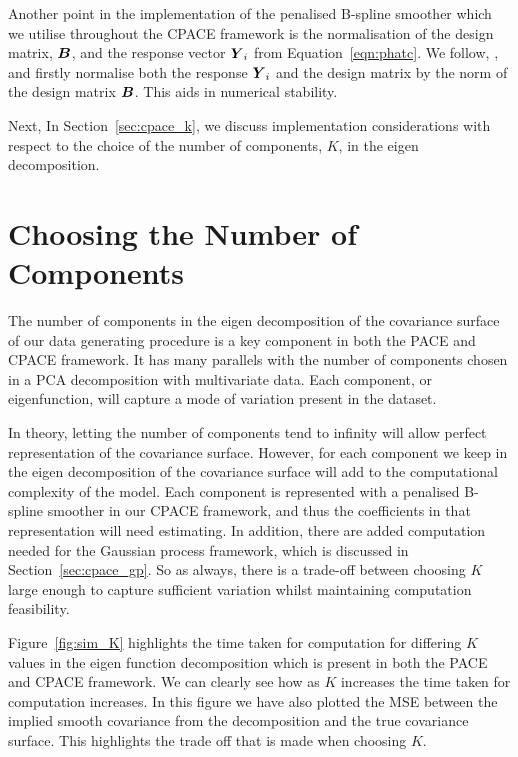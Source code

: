 Another point in the implementation of the penalised B-spline smoother which we utilise throughout the CPACE framework is the normalisation of the design matrix, $\bm{{B}}$, and the response vector $\bm{{Y}}_{i}$ from Equation~\ref{eqn:phatc}.
We follow, \citep{wood_generalized_2006}, and firstly normalise both the response $\bm{{Y}}_{i}$ and the design matrix by the norm of the design matrix $\bm{{B}}$.
This aids in numerical stability. 

Next, In Section~\ref{sec:cpace_k}, we discuss implementation considerations with respect to the choice of the number of components, $K$, in the eigen decomposition.

\section{Choosing the Number of Components \label{sec:cpace_k}}
The number of components in the eigen decomposition of the covariance surface of our data generating procedure is a key component in both the PACE and CPACE framework.
It has many parallels with the number of components chosen in a PCA decomposition with multivariate data. 
Each component, or eigenfunction, will capture a mode of variation present in the dataset.

In theory, letting the number of components tend to infinity will allow perfect representation of the covariance surface.
However, for each component we keep in the eigen decomposition of the covariance surface will add to the computational complexity of the model.
Each component is represented with a penalised B-spline smoother in our CPACE framework, and thus the coefficients in that representation will need estimating. 
In addition, there are added computation needed for the Gaussian process framework, which is discussed in Section~\ref{sec:cpace_gp}.
So as always, there is a trade-off between choosing $K$ large enough to capture sufficient variation whilst maintaining computation feasibility.

Figure~\ref{fig:sim_K} highlights the time taken for computation for differing $K$ values in the eigen function decomposition which is present in both the PACE and CPACE framework.
We can clearly see how as $K$ increases the time taken for computation increases.
In this figure we have also plotted the MSE between the implied smooth covariance from the decomposition and the true covariance surface.
This highlights the trade off that is made when choosing $K$.

